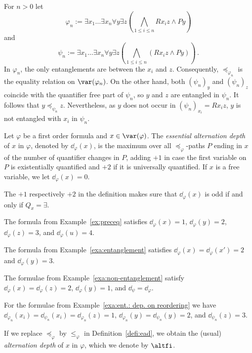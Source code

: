 \documentclass{LMCS}
\renewcommand{\phi}{\varphi}
\newcommand{\ad}{\dd_{\varphi}}
\begin{document}
\begin{exa}\label{exa:ent.: dep. on reordering}
For $n>0$ let 
\[\phi_n:=\exists x_1\ldots\exists x_n\forall y\exists z
  \left(\bigwedge\limits_{1\leq i\leq n}Rx_iz\wedge Py\right)\] 
and 
\[\psi_n:=\exists x_1\ldots\exists x_n\forall y\exists z
  \left(\bigwedge\limits_{1\leq i\leq n}(Rx_iz\wedge Py)\right)\,.\] 
In $\phi_n$, the only entanglements are between the $x_i$ and $z$. 
Consequently, $\preceq_{\phi_n}$ is the equality relation on $\var(\phi_n)$. 
On the other hand, both $(\psi_n)_y$ and $(\psi_n)_z$ 
coincide with the quantifier free part of $\psi_n$, 
so $y$ and $z$ are entangled in $\psi_n$. 
It follows that $y\preceq_{\psi_n}z$. 
Nevertheless, as $y$ does not occur in $(\psi_n)_{x_i}=Rx_iz$, 
$y$ is not entangled with $x_i$ in $\psi_n$. 
\end{exa}

\begin{defi}\label{defi:ead} 
	Let $\phi$ be a first order formula and $x\in\var(\phi)$. 
	The \emph{essential alternation depth} of $x$ in $\phi$, denoted by $\ad(x)$,
	is the maximum over all $\preceq_{\phi}$-paths $P$ ending in $x$ 
	of the number of quantifier changes in $P$, 
	adding $+1$ in case the first variable on $P$ is existentially quantified 
	and $+2$ if it is universally quantified. 
	If $x$ is a free variable, we let $\ad(x)=0$.
\end{defi}

The $+1$ respectively $+2$ in the definition 
makes sure that $\ad(x)$ is odd if and only if $Q_x=\exists$. 

\begin{exa}
The formula from Example~\ref{ex:preceq} 
satisfies $\ad(x)=1$, $\ad(y)=2$, $\ad(z)=3$, and $\ad(u)=4$. 

The formula from Example~\ref{exa:entanglement} 
satisfies $\ad(x)=\ad(x')=2$ and $\ad(y)=3$. 

The formulae from Example~\ref{exa:non-entanglement} 
satisfy $\ad(x)=\ad(z)=2$, $\ad(y)=1$, and $\dd_{\psi}=\ad$. 

For the formulae from Example~\ref{exa:ent.: dep. on reordering} 
we have $\dd_{\phi_n}(x_i)=\dd_{\psi_n}(x_i)=\dd_{\phi_n}(z)=1$, 
$\dd_{\phi_n}(y)=\dd_{\psi_n}(y)=2$, and $\dd_{\psi_n}(z)=3$. 
\end{exa}


\begin{defi}\label{defi:ad} 
If we replace $\preceq_{\phi}$ by $\leq_{\phi}$ in Definition~\ref{defi:ead}, 
we obtain the (usual) \emph{alternation depth} of $x$ in $\phi$, 
which we denote by $\altfi$.
\end{defi}
\end{document}
